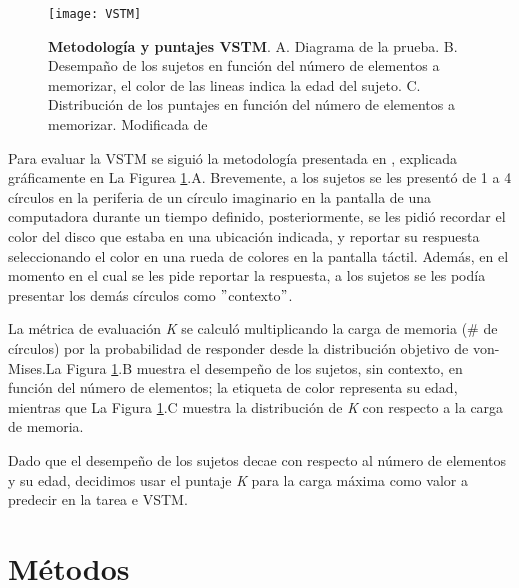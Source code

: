 \documentclass[11pt,letterpaper]{article}
\numberwithin{equation}{subsection}
\numberwithin{table}{subsection}
\begin{document}
\begin{figure}[H]
\centering
	\texttt{[image: VSTM]}
	\captionsetup{labelfont=bf}
	\caption{\scriptsize \textbf{Metodología y puntajes VSTM}. A. Diagrama de la prueba. B. Desempaño de los sujetos en función del número de elementos a memorizar, el color de las lineas indica la edad del sujeto. C. Distribución de los puntajes en función del número de elementos a memorizar. Modificada de \cite{mitchell2018visual}}
	\label{fig:VSTM}
\end{figure}

\bigskip
\noindent Para evaluar la VSTM se siguió la metodología presentada en \cite{mitchell2018visual}, explicada gráficamente en La Figurea \ref{fig:VSTM}.A. Brevemente, a los sujetos se les presentó de 1 a 4 círculos en la periferia de un círculo imaginario en la pantalla de una computadora durante un tiempo definido, posteriormente, se les pidió recordar el color del disco que estaba en una ubicación indicada, y reportar su respuesta seleccionando el color en una rueda de colores en la pantalla táctil. Además, en el momento en el cual se les pide reportar la respuesta, a los sujetos se les podía presentar los demás círculos como $"$contexto$"$.

\bigskip
\noindent La métrica de evaluación \textit{K} se calculó multiplicando la carga de memoria (\# de círculos) por la probabilidad de responder desde la distribución objetivo de von-Mises.La Figura \ref{fig:VSTM}.B muestra el desempeño de los sujetos, sin contexto, en función del número de elementos; la etiqueta de color representa su edad, mientras que La Figura \ref{fig:VSTM}.C muestra la distribución de \textit{K} con respecto a la carga de memoria.

\bigskip
\noindent Dado que el desempeño de los sujetos decae con respecto al número de elementos y su edad, decidimos usar el puntaje \textit{K} para la carga máxima como valor a predecir en la tarea e VSTM. 

\section{Métodos}
\end{document}
